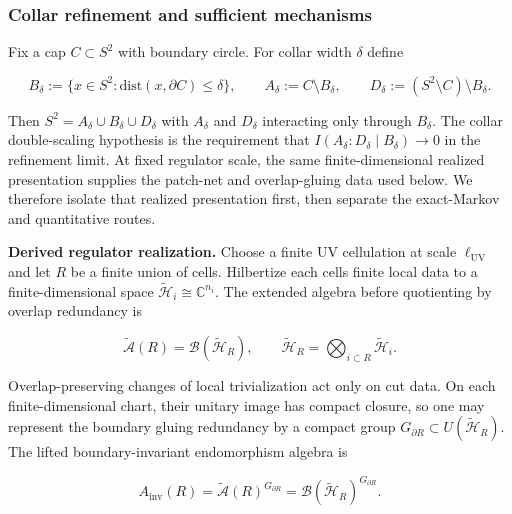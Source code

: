 \subsubsection{Collar refinement and sufficient mechanisms}\label{23-collar-refinement-and-sufficient-mechanisms}

Fix a cap \(C \subset S^2\) with boundary circle. For collar width \(\delta\) define

\[
B_\delta := \{x \in S^2 : \mathrm{dist}(x,\partial C) \le \delta\},
\qquad
A_\delta := C \setminus B_\delta,
\qquad
D_\delta := (S^2 \setminus C) \setminus B_\delta.
\]

Then \(S^2 = A_\delta \cup B_\delta \cup D_\delta\) with \(A_\delta\) and \(D_\delta\) interacting only through \(B_\delta\). The collar double-scaling hypothesis is the requirement that \(I(A_\delta:D_\delta \mid B_\delta) \to 0\) in the refinement limit. At fixed regulator scale, the same finite-dimensional realized presentation supplies the patch-net and overlap-gluing data used below. We therefore isolate that realized presentation first, then separate the exact-Markov and quantitative routes.

\textbf{Derived regulator realization.} Choose a finite UV cellulation at scale \(\ell_{\mathrm{UV}}\) and let \(R\) be a finite union of cells. Hilbertize each cell\textquotesingle s finite local data to a finite-dimensional space \(\tilde{\mathcal H}_i\cong \mathbb C^{n_i}\). The extended algebra before quotienting by overlap redundancy is

\[
\widetilde{\mathcal A}(R)=\mathcal B(\tilde{\mathcal H}_R),
\qquad
\tilde{\mathcal H}_R=\bigotimes_{i\subset R}\tilde{\mathcal H}_i.
\]

Overlap-preserving changes of local trivialization act only on cut data. On each finite-dimensional chart, their unitary image has compact closure, so one may represent the boundary gluing redundancy by a compact group \(G_{\partial R}\subset U(\tilde{\mathcal H}_R)\). The lifted boundary-invariant endomorphism algebra is

\[
A_{\mathrm{inv}}(R)=\widetilde{\mathcal A}(R)^{G_{\partial R}}
=\mathcal B(\tilde{\mathcal H}_R)^{G_{\partial R}}.
\]

